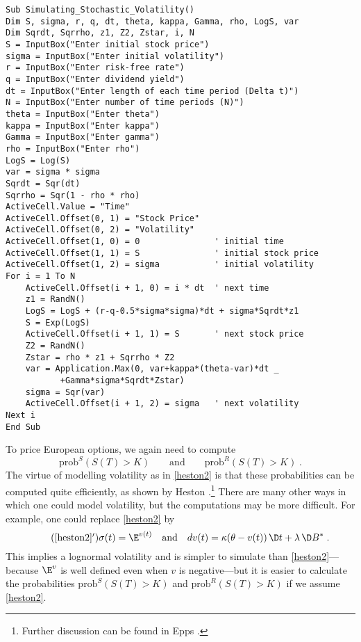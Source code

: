 \small\begin{verbatim}
Sub Simulating_Stochastic_Volatility()
Dim S, sigma, r, q, dt, theta, kappa, Gamma, rho, LogS, var
Dim Sqrdt, Sqrrho, z1, Z2, Zstar, i, N
S = InputBox("Enter initial stock price")
sigma = InputBox("Enter initial volatility")
r = InputBox("Enter risk-free rate")
q = InputBox("Enter dividend yield")
dt = InputBox("Enter length of each time period (Delta t)")
N = InputBox("Enter number of time periods (N)")
theta = InputBox("Enter theta")
kappa = InputBox("Enter kappa")
Gamma = InputBox("Enter gamma")
rho = InputBox("Enter rho")
LogS = Log(S)
var = sigma * sigma
Sqrdt = Sqr(dt)
Sqrrho = Sqr(1 - rho * rho)
ActiveCell.Value = "Time"
ActiveCell.Offset(0, 1) = "Stock Price"
ActiveCell.Offset(0, 2) = "Volatility"
ActiveCell.Offset(1, 0) = 0               ' initial time
ActiveCell.Offset(1, 1) = S               ' initial stock price
ActiveCell.Offset(1, 2) = sigma           ' initial volatility
For i = 1 To N
    ActiveCell.Offset(i + 1, 0) = i * dt  ' next time
    z1 = RandN()
    LogS = LogS + (r-q-0.5*sigma*sigma)*dt + sigma*Sqrdt*z1
    S = Exp(LogS)
    ActiveCell.Offset(i + 1, 1) = S       ' next stock price
    Z2 = RandN()
    Zstar = rho * z1 + Sqrrho * Z2
    var = Application.Max(0, var+kappa*(theta-var)*dt _
           +Gamma*sigma*Sqrdt*Zstar)
    sigma = Sqr(var)
    ActiveCell.Offset(i + 1, 2) = sigma   ' next volatility
Next i
End Sub
\end{verbatim}\normalsize


To price European options, we again need to compute 
$$\text{prob}^S(S(T)>K) \qquad \text{and} \qquad \text{prob}^R(S(T)>K)\; .$$
The virtue of modelling volatility as in \eqref{heston2} is that these probabilities can be computed quite efficiently, as shown by Heston \cite{Heston}.\footnote{Further discussion can be found in Epps \cite{Epps}.}  There are many other ways in which one could model volatility, but the computations may be more difficult.  For example, one could  replace \eqref{heston2} by
\begin{equation}\label{heston5}\tag{\ref{heston2}$'$}
\sigma(t) = \E^{v(t)} \quad \text{and} \quad dv(t) = \kappa (\theta-v(t))\,\D t + \lambda \,\D B^*\;.
\end{equation}
This implies a lognormal volatility and is simpler to simulate than \eqref{heston2}---because $\E^{v}$ is well defined even when $v$ is negative---but it is easier to calculate the probabilities $\text{prob}^S(S(T)>K)$ and $\text{prob}^R(S(T)>K)$ if we assume \eqref{heston2}.

